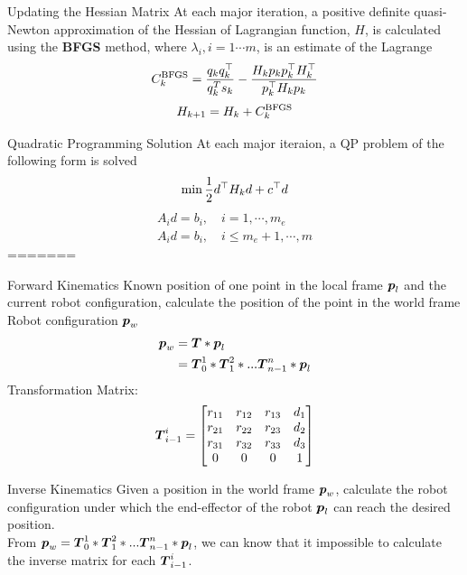 \documentclass[10pt, compress]{beamer}
\begin{document}
\begin{frame}[fragile]{Updating the Hessian Matrix}
At each major iteration, a positive definite quasi-Newton approximation of the Hessian of Lagrangian function, $H$, is calculated using the \textbf{BFGS} method, where $\lambda_i, i = 1\cdots m$, is an estimate of the Lagrange
$$C_k^{\rm BFGS} = {q_kq_k^\top \over q_k^T s_k} - {H_k p_k p_k^\top H_k^\top \over p_k^\top H_k p_k}$$
$$H_{k+1} = H_{k} + C_k^{\rm BFGS}$$
\end{frame}

\begin{frame}[fragile]{Quadratic Programming Solution}
At each major iteraion, a QP problem of the following form is solved
$$\min {1 \over 2} d^\top H_k d + c^\top d$$
\begin{eqnarray*}
A_i d = b_i, \quad i = 1,\cdots , m_e \\
A_i d = b_i, \quad i \leq m_e + 1,\cdots , m
\end{eqnarray*}
=======

\begin{frame}[fragile]{Forward Kinematics}
Known position of one point in the local frame $\mbox{\boldmath $p$}_l$ and the current robot configuration, calculate the position of the point in the world frame Robot configuration $\mbox{\boldmath $p$}_w$\\
\[
\begin{split}
\mbox{\boldmath $p$}_w &=\mbox{\boldmath $T$} * \mbox{\boldmath $p$}_l \\
&= \mbox{\boldmath $T$}_0^1 * \mbox{\boldmath $T$}_1^2* ... \mbox{\boldmath $T$}_{n-1}^n * \mbox{\boldmath $p$}_l 
\end{split}
\]
Transformation Matrix:
\[
\mbox{\boldmath $T$}_{i-1}^{i}=
 \left[
 \begin{matrix}
   r_{11} & r_{12} & r_{13} & d_1\\
   r_{21} & r_{22} & r_{23} & d_2 \\
   r_{31} & r_{32} & r_{33} & d_3 \\
   0& 0 & 0 & 1
  \end{matrix}
  \right] 
\]
\end{frame}

\begin{frame}[fragile]{Inverse Kinematics}
Given a position in the world frame $\mbox{\boldmath $p$}_w$, calculate the robot configuration under which the end-effector of the robot $\mbox{\boldmath $p$}_l$ can reach the desired position. \\ 

From  $\mbox{\boldmath $p$}_w =\mbox{\boldmath $T$}_0^1 * \mbox{\boldmath $T$}_1^2* ... \mbox{\boldmath $T$}_{n-1}^n * \mbox{\boldmath $p$}_l$, we can know that it impossible to calculate the inverse matrix for each $\mbox{\boldmath $T$}_{i-1}^{i}$. 


\end{frame}
\end{frame}
\end{document}

